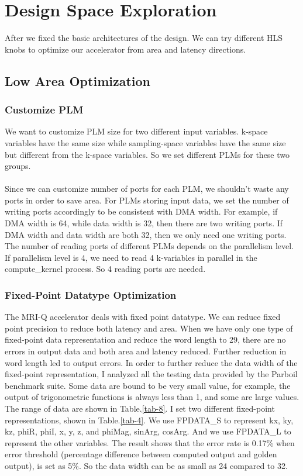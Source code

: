 \section{Design Space Exploration}

After we fixed the basic architectures of the design. We can try different HLS
knobs to optimize our accelerator from area and latency directions. \\

\subsection{Low Area Optimization}

\subsubsection{Customize PLM}

We want to customize PLM size for two different input variables. k-space
variables have the same size while sampling-space variables have the same size
but different from the k-space variables. So we set different PLMs for these two
groups. \\ \\ Since we can customize number of ports for each PLM, we shouldn't
waste any ports in order to save area. For PLMs storing input data, we set the
number of writing ports accordingly to be consistent with DMA width. For
example, if DMA width is 64, while data width is 32, then there are two writing
ports. If DMA width and data width are both 32, then we only need one writing
ports. The number of reading ports of different PLMs depends on the parallelism
level. If parallelism level is 4, we need to read 4 k-variables in parallel in
the compute\_kernel process. So 4 reading ports are needed.\\

\subsubsection{Fixed-Point Datatype Optimization}

The MRI-Q accelerator deals with fixed point datatype. We can reduce fixed point
precision to reduce both latency and area. When we have only one type of
fixed-point data representation and reduce the word length to 29, there are no
errors in output data and both area and latency reduced. Further reduction in
word length led to output errors. In order to further reduce the data width of
the fixed-point representation, I analyzed all the testing data provided by the
Parboil benchmark suite. Some data are bound to be very small value, for
example, the output of trigonometric functions is always less than 1, and some
are large values. The range of data are shown in Table.\ref{tab-8}. I set two
different fixed-point representations, shown in Table.\ref{tab-4}. We use
FPDATA\_S to represent kx, ky, kz, phiR, phiI, x, y, z, and phiMag, sinArg,
cosArg. And we use FPDATA\_L to represent the other variables. The result shows
that the error rate is 0.17\% when error threshold (percentage difference
between computed output and golden output), is set as 5\%. So the data width can
be as small as 24 compared to 32. \\

